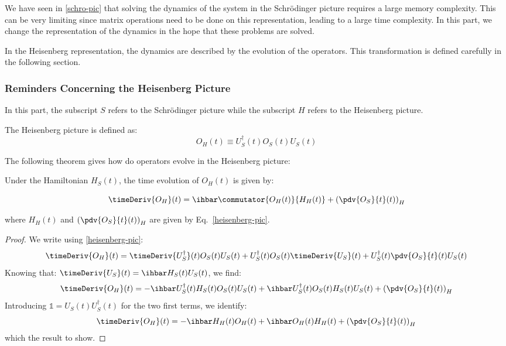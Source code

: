We have seen in \ref{schro-pic} that solving the dynamics of the system in the Schrödinger picture requires a large memory complexity. This can be very limiting since matrix operations need to be done on this representation, leading to a large time complexity. In this part, we change the representation of the dynamics in the hope that these problems are solved.

In the Heisenberg representation, the dynamics are described by the evolution of the operators. This transformation is defined carefully in the following section.

\subsubsection{Reminders Concerning the Heisenberg Picture}

In this part, the subscript $S$ refers to the Schrödinger picture while the subscript $H$ refers to the Heisenberg picture.

\begin{definition}
    The Heisenberg picture is defined as:
    \begin{equation} \label{heisenberg-pic}
        O_H(t) \equiv U_S^\dagger(t) O_S(t) U_S(t)
    \end{equation}
\end{definition}

The following theorem gives how do operators evolve in the Heisenberg picture:

\begin{theorem}
    Under the Hamiltonian $H_S(t)$, the time evolution of $O_H(t)$ is given by:

    \begin{equation}
        \timeDeriv{O_H}(t) = \ihbar \commutator{O_H(t)}{H_H(t)} + \left(\pdv{O_S}{t}(t)\right)_H
    \end{equation}

    where $H_H(t)$ and $\left(\pdv{O_S}{t}(t)\right)_H$ are given by Eq.~\ref{heisenberg-pic}.
\end{theorem}
\begin{proof}
    We write using \ref{heisenberg-pic}:
    \begin{equation}
        \timeDeriv{O_H}(t) = \timeDeriv{U_S^\dagger}(t) O_S(t) U_S(t) + U_S^\dagger(t) O_S(t) \timeDeriv{U_S}(t) + U_S^\dagger(t) \pdv{O_S}{t}(t) U_S(t)
    \end{equation}
    Knowing that: $\timeDeriv{U_S}(t) = \ihbar H_S(t) U_S(t)$, we find:
    \begin{equation}
        \timeDeriv{O_H}(t) = - \ihbar U_S^\dagger(t) H_S(t) O_S(t) U_S(t) + \ihbar U_S^\dagger(t) O_S(t) H_S(t) U_S(t) + \left(\pdv{O_S}{t}(t)\right)_H
    \end{equation}
    Introducing $\mathbb{1} = U_S(t) U_S^\dagger(t)$ for the two first terms, we identify:
    \begin{equation}
        \timeDeriv{O_H}(t) = - \ihbar H_H(t) O_H(t) + \ihbar O_H(t) H_H(t) + \left(\pdv{O_S}{t}(t)\right)_H
    \end{equation}
    which the result to show.
\end{proof}


